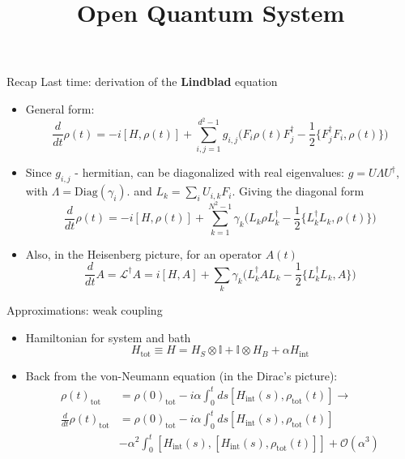 \documentclass[10pt,xcolor={table,dvipsnames},t]{beamer}
\title{Open Quantum System}
\subtitle{Lectures: \\ 
  \footnotesize
  \begin{itemize}
      \setlength\itemsep{-0.5em}
    \item Daniel Manzano, A short introduction to the Lindblad master equation (\textit{all})
    \item Breuer and Petruccione, The Theory of Open Quantum Systems (\textit{ch. 3 - 4.3})
    \item Daniel A. Lidar, Notes on the Theory of Open Quantum Systems (\textit{up to ch. 12})
  \end{itemize}
}
\newcommand{\dt}{\frac{d}{dt}}
\newcommand{\Hint}{H_{\text{int}}}
\begin{document}
\begin{frame}
  \titlepage
\end{frame}


\begin{frame}{Recap}
  Last time: derivation of the \textbf{Lindblad} equation\\
  \begin{itemize}
    \item<1-> General form: 
  $$
  \dt \rho(t)  = -i[H, \rho(t)] + \sum_{i,j=1}^{d^2-1}g_{i,j}\biggl( F_i\rho(t)F_j^\dag -\frac{1}{2}\bigr\{ F_j^\dag F_i, \rho(t) \bigl\} \biggr)
  $$

\item<2-> Since $g_{i,j}$ - hermitian, can be diagonalized with real eigenvalues: $g=U\Lambda U^\dag$, with $\Lambda = \text{Diag}(\gamma_i)$.
  and $L_k = \sum_i U_{i,k} F_i$. Giving the diagonal form
  \begin{equation}
  \dt \rho(t) = -i[H, \rho(t)]+\sum_{k=1}^{N^2-1} \gamma_k \biggl( L_k\rho L_k^\dag - \frac{1}{2}\bigl\{ L^\dag_k L_k, \rho(t) \bigr\} \biggr)
  \label{eq:master_equation}
  \end{equation}
\item<3-> Also, in the Heisenberg picture, for an operator $A(t)$
  \begin{equation}
    \dt A = \mathcal{L}^\dag A = 
    i[H,A]+\sum_k \gamma_k \biggl( L_k^\dag A L_k -\frac{1}{2}\bigl\{ L^\dag_k L_k, A \bigr\} \biggr)
  \end{equation}

\end{itemize}
\end{frame}

\begin{frame}{Approximations: weak coupling}
  \begin{itemize}
    \item<1-> Hamiltonian for system and bath
      \begin{equation}
        H_{\text{tot}} \equiv H = H_{S}\otimes \mathbb{I} + \mathbb{I}\otimes H_B + \alpha \Hint
    \end{equation}
  \item<2-> Back from the von-Neumann equation (in the Dirac's picture):
    \begin{equation}
      \begin{split}
        \rho(t)_\text{tot} &= \rho(0)_\text{tot} -i\alpha \int_0^tds[\Hint(s), \rho_\text{tot}(t)] \rightarrow \\
        \dt \rho(t)_\text{tot} &= \rho(0)_\text{tot} -i\alpha \int_0^tds[\Hint(s), \rho_\text{tot}(t)]\\
                           &- \alpha^2 \int_0^t [\Hint(s),[\Hint(s), \rho_\text{tot}(t)]] + \mathcal{O}(\alpha^3) \\
      \end{split}
    \end{equation}
  \end{itemize}

\end{frame}
\end{document}
